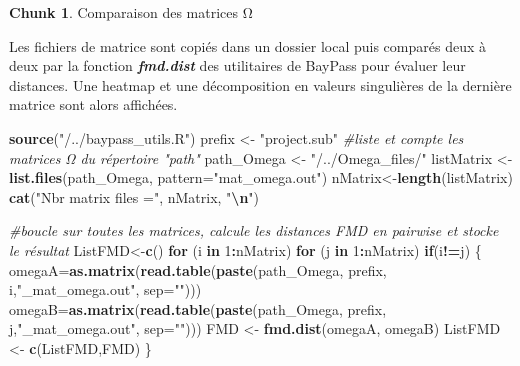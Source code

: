 \documentclass[
  openany]{book}
\newenvironment{Shaded}{\begin{snugshade}}{\end{snugshade}}
\newcommand{\AttributeTok}[1]{\textcolor[rgb]{0.13,0.29,0.53}{#1}}
\newcommand{\CommentTok}[1]{\textcolor[rgb]{0.56,0.35,0.01}{\textit{#1}}}
\newcommand{\ControlFlowTok}[1]{\textcolor[rgb]{0.13,0.29,0.53}{\textbf{#1}}}
\newcommand{\DecValTok}[1]{\textcolor[rgb]{0.00,0.00,0.81}{#1}}
\newcommand{\FunctionTok}[1]{\textcolor[rgb]{0.13,0.29,0.53}{\textbf{#1}}}
\newcommand{\NormalTok}[1]{#1}
\newcommand{\OtherTok}[1]{\textcolor[rgb]{0.56,0.35,0.01}{#1}}
\newcommand{\SpecialCharTok}[1]{\textcolor[rgb]{0.81,0.36,0.00}{\textbf{#1}}}
\newcommand{\StringTok}[1]{\textcolor[rgb]{0.31,0.60,0.02}{#1}}
\theoremstyle{definition}
\theoremstyle{definition}
\theoremstyle{definition}
\newtheorem{exercise}{Chunk}[chapter]
\theoremstyle{definition}
\theoremstyle{remark}
\begin{document}
\begin{exercise}
\protect\hypertarget{exr:chunk4}{}\label{exr:chunk4}{Comparaison des matrices Ω}
\end{exercise}

Les fichiers de matrice sont copiés dans un dossier local puis comparés deux à deux par la fonction \textbf{\emph{fmd.dist}} des utilitaires de BayPass pour évaluer leur distances.
Une heatmap et une décomposition en valeurs singulières de la dernière matrice sont alors affichées.

\begin{Shaded}
\begin{Highlighting}[]
\FunctionTok{source}\NormalTok{(}\StringTok{"/../baypass\_utils.R"}\NormalTok{)}
\NormalTok{prefix }\OtherTok{\textless{}{-}} \StringTok{"project.sub"}
\CommentTok{\#liste et compte les matrices Ω du répertoire "path"}
\NormalTok{path\_Omega }\OtherTok{\textless{}{-}} \StringTok{"/../Omega\_files/"}
\NormalTok{listMatrix }\OtherTok{\textless{}{-}} \FunctionTok{list.files}\NormalTok{(path\_Omega, }\AttributeTok{pattern=}\StringTok{"mat\_omega.out"}\NormalTok{)}
\NormalTok{nMatrix}\OtherTok{\textless{}{-}}\FunctionTok{length}\NormalTok{(listMatrix)}
\FunctionTok{cat}\NormalTok{(}\StringTok{"Nbr matrix files ="}\NormalTok{, nMatrix, }\StringTok{"}\SpecialCharTok{\textbackslash{}n}\StringTok{"}\NormalTok{)}

\CommentTok{\#boucle sur toutes les matrices, calcule les distances FMD en pairwise et stocke le résultat}
\NormalTok{ListFMD}\OtherTok{\textless{}{-}}\FunctionTok{c}\NormalTok{()}
\ControlFlowTok{for}\NormalTok{ (i }\ControlFlowTok{in} \DecValTok{1}\SpecialCharTok{:}\NormalTok{nMatrix) }\ControlFlowTok{for}\NormalTok{ (j }\ControlFlowTok{in} \DecValTok{1}\SpecialCharTok{:}\NormalTok{nMatrix) }\ControlFlowTok{if}\NormalTok{(i}\SpecialCharTok{!=}\NormalTok{j) \{}
\NormalTok{omegaA}\OtherTok{=}\FunctionTok{as.matrix}\NormalTok{(}\FunctionTok{read.table}\NormalTok{(}\FunctionTok{paste}\NormalTok{(path\_Omega, prefix, i,}\StringTok{"\_mat\_omega.out"}\NormalTok{, }\AttributeTok{sep=}\StringTok{""}\NormalTok{)))}
\NormalTok{omegaB}\OtherTok{=}\FunctionTok{as.matrix}\NormalTok{(}\FunctionTok{read.table}\NormalTok{(}\FunctionTok{paste}\NormalTok{(path\_Omega, prefix, j,}\StringTok{"\_mat\_omega.out"}\NormalTok{, }\AttributeTok{sep=}\StringTok{""}\NormalTok{)))}
\NormalTok{FMD }\OtherTok{\textless{}{-}} \FunctionTok{fmd.dist}\NormalTok{(omegaA, omegaB)}
\NormalTok{ListFMD }\OtherTok{\textless{}{-}} \FunctionTok{c}\NormalTok{(ListFMD,FMD)}
\NormalTok{\}}


\end{Highlighting}
\end{Shaded}
\end{document}
